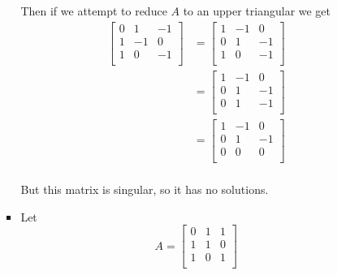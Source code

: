 \documentclass[12pt,letterpaper]{article}
\begin{document}
\begin{enumerate}
\begin{enumerate}
\begin{itemize}
              Then if we attempt to reduce $A$ to an upper triangular we get
              \begin{align*}
                \begin{bmatrix}
                  0  &  1 & -1 \\
                  1  & -1 &  0 \\
                  1  &  0 & -1 \\
                \end{bmatrix}
                &=
                \begin{bmatrix}
                  1  & -1 &  0 \\
                  0  &  1 & -1 \\
                  1  &  0 & -1 \\
                \end{bmatrix}
                \\
                &=
                \begin{bmatrix}
                  1  & -1 &  0 \\
                  0  &  1 & -1 \\
                  0  &  1 & -1 \\
                \end{bmatrix}
                \\
                &=
                \begin{bmatrix}
                  1  & -1 &  0 \\
                  0  &  1 & -1 \\
                  0  &  0 &  0 \\
                \end{bmatrix}
                \\
              \end{align*}

              But this matrix is singular, so it has no solutions.

            \item

              Let
              \[
                A
                =
                \begin{bmatrix}
                  0  &  1 &  1 \\
                  1  &  1 &  0 \\
                  1  &  0 &  1 \\
                \end{bmatrix}
              \]


\end{itemize}
\end{enumerate}
\end{enumerate}
\end{document}
